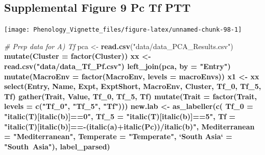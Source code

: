 \documentclass[
]{article}
\newenvironment{Shaded}{\begin{snugshade}}{\end{snugshade}}
\newcommand{\CommentTok}[1]{\textcolor[rgb]{0.56,0.35,0.01}{\textit{#1}}}
\newcommand{\DataTypeTok}[1]{\textcolor[rgb]{0.13,0.29,0.53}{#1}}
\newcommand{\DecValTok}[1]{\textcolor[rgb]{0.00,0.00,0.81}{#1}}
\newcommand{\KeywordTok}[1]{\textcolor[rgb]{0.13,0.29,0.53}{\textbf{#1}}}
\newcommand{\NormalTok}[1]{#1}
\newcommand{\OperatorTok}[1]{\textcolor[rgb]{0.81,0.36,0.00}{\textbf{#1}}}
\newcommand{\StringTok}[1]{\textcolor[rgb]{0.31,0.60,0.02}{#1}}
\begin{document}
\hypertarget{supplemental-figure-9-pc-tf-ptt}{%
\subsection{Supplemental Figure 9 Pc Tf
PTT}\label{supplemental-figure-9-pc-tf-ptt}}

\texttt{[image: Phenology\_Vignette\_files/figure-latex/unnamed-chunk-98-1]}

\begin{Shaded}
\begin{Highlighting}[]
\CommentTok{# Prep data for A) Tf}
\NormalTok{pca <-}\StringTok{ }\KeywordTok{read.csv}\NormalTok{(}\StringTok{"data/data_PCA_Results.csv"}\NormalTok{) }\OperatorTok{%
\StringTok{  }\KeywordTok{mutate}\NormalTok{(}\DataTypeTok{Cluster =} \KeywordTok{factor}\NormalTok{(Cluster))}
\NormalTok{xx <-}\StringTok{ }\KeywordTok{read.csv}\NormalTok{(}\StringTok{"data/data_Tf_Pf.csv"}\NormalTok{) }\OperatorTok{%
\StringTok{  }\KeywordTok{left_join}\NormalTok{(pca, }\DataTypeTok{by =} \StringTok{"Entry"}\NormalTok{) }\OperatorTok{%
\StringTok{  }\KeywordTok{mutate}\NormalTok{(}\DataTypeTok{MacroEnv =} \KeywordTok{factor}\NormalTok{(MacroEnv, }\DataTypeTok{levels =}\NormalTok{ macroEnvs))}
\NormalTok{x1 <-}\StringTok{ }\NormalTok{xx }\OperatorTok{%
\StringTok{  }\KeywordTok{select}\NormalTok{(Entry, Name, Expt, ExptShort, MacroEnv, Cluster, Tf_}\DecValTok{0}\NormalTok{, Tf_}\DecValTok{5}\NormalTok{, Tf) }\OperatorTok{%
\StringTok{  }\KeywordTok{gather}\NormalTok{(Trait, Value, Tf_}\DecValTok{0}\NormalTok{, Tf_}\DecValTok{5}\NormalTok{, Tf) }\OperatorTok{%
\StringTok{  }\KeywordTok{mutate}\NormalTok{(}\DataTypeTok{Trait =} \KeywordTok{factor}\NormalTok{(Trait, }\DataTypeTok{levels =} \KeywordTok{c}\NormalTok{(}\StringTok{"Tf_0"}\NormalTok{, }\StringTok{"Tf_5"}\NormalTok{, }\StringTok{"Tf"}\NormalTok{)))}
\NormalTok{new.lab <-}\StringTok{ }\KeywordTok{as_labeller}\NormalTok{(}\KeywordTok{c}\NormalTok{(}
  \DataTypeTok{Tf_0 =} \StringTok{"italic(T)[italic(b)]==0"}\NormalTok{, }\DataTypeTok{Tf_5 =} \StringTok{"italic(T)[italic(b)]==5"}\NormalTok{,}
  \DataTypeTok{Tf =} \StringTok{"italic(T)[italic(b)]==-(italic(a)+italic(Pc))/italic(b)"}\NormalTok{, }
  \DataTypeTok{Mediterranean =} \StringTok{"Mediterranean"}\NormalTok{, }\DataTypeTok{Temperate =} \StringTok{"Temperate"}\NormalTok{, }
  \StringTok{`}\DataTypeTok{South Asia}\StringTok{`}\NormalTok{ =}\StringTok{ "South~Asia"}\NormalTok{), label_parsed)}
}}}}}}
\end{Highlighting}
\end{Shaded}
\end{document}
